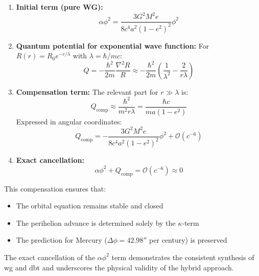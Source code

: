 \begin{enumerate}
    \item \textbf{Initial term (pure WG):}
    \begin{equation}
        \alpha\phi^2 = \frac{3G^2M^2e}{8c^4a^2(1-e^2)^2}\phi^2
    \end{equation}

    \item \textbf{Quantum potential for exponential wave function:}
    For $R(r) = R_0e^{-r/\lambda}$ with $\lambda = \hbar/mc$:
    \begin{equation}
        \label{eq:q_wg_dbt}
        Q = -\frac{\hbar^2}{2m}\frac{\nabla^2 R}{R} \approx -\frac{\hbar^2}{2m}\left(\frac{1}{\lambda^2} - \frac{2}{r\lambda}\right)
    \end{equation}

    \item \textbf{Compensation term:}
    The relevant part for $r \gg \lambda$ is:
    \begin{equation}
        Q_{\text{comp}} \approx \frac{\hbar^2}{m^2 r\lambda} = \frac{\hbar c}{m a(1-e^2)}
    \end{equation}
    Expressed in angular coordinates:
    \begin{equation}
        \label{eq:q_laplace_wg_dbt}
        Q_{\text{comp}} = -\frac{3G^2M^2e}{8c^4a^2(1-e^2)^2}\phi^2 + \mathcal{O}(c^{-6})
    \end{equation}

    \item \textbf{Exact cancellation:}
    \begin{equation}
        \alpha\phi^2 + Q_{\text{comp}} = \mathcal{O}(c^{-6}) \approx 0
    \end{equation}
\end{enumerate}

\noindent This compensation ensures that:
\begin{itemize}
    \item The orbital equation remains stable and closed
    \item The perihelion advance is determined solely by the $\kappa$-term
    \item The prediction for Mercury ($\Delta\phi = 42.98''$ per century) is preserved
\end{itemize}

The exact cancellation of the $\alpha\phi^2$ term demonstrates the consistent synthesis of \gls{wg} and \gls{dbt} and underscores the physical validity of the hybrid approach.

